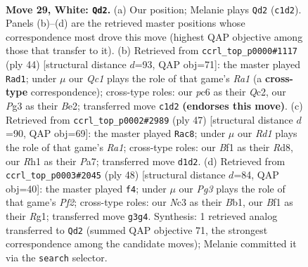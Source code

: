 \documentclass[11pt]{article}
\begin{document}
\clearpage

\begin{figure}[p]\centering
\begin{subfigure}{0.46\textwidth}\centering
\resizebox{\linewidth}{!}{%
\newchessgame
\chessboard[
  setfen={1nb3r1/rp4k1/2pqp3/p2p1p1p/Pn1P1P1N/2N3P1/1PP3KP/2QR1B1R w - - 11 29},
  showmover=false,
  pgfstyle=straightmove, color=movearrow, markmove={c1-d2}
]}
\caption{}
\end{subfigure}\hfill
\begin{subfigure}{0.46\textwidth}\centering
\resizebox{\linewidth}{!}{%
\newchessgame
\chessboard[
  setfen={r1r3k1/1p2qp1p/p2ppnpb/P7/1Pn1P3/2NR1P2/1PQ1BBPP/R5K1 w - - 1 23},
  showmover=false,
  pgfstyle=straightmove, color=movearrow, markmove={a1-d1}
]}
\caption{}
\end{subfigure}
\\[4pt]
\begin{subfigure}{0.46\textwidth}\centering
\resizebox{\linewidth}{!}{%
\newchessgame
\chessboard[
  setfen={r2r2k1/pb2qpp1/1p1ppn1p/4n3/1PPNP3/P1Q4P/3N1PP1/3RRBK1 b - - 0 24},
  showmover=false,
  pgfstyle=straightmove, color=movearrow, markmove={a8-c8}
]}
\caption{}
\end{subfigure}\hfill
\begin{subfigure}{0.46\textwidth}\centering
\resizebox{\linewidth}{!}{%
\newchessgame
\chessboard[
  setfen={1r1qbnk1/2r3pp/1p2p3/p2pPp2/Pn1P4/RNN1Q3/1P3PPP/1B4RK w - - 0 25},
  showmover=false,
  pgfstyle=straightmove, color=movearrow, markmove={f2-f4}
]}
\caption{}
\end{subfigure}
\caption{\textbf{Move 29, White: \texttt{Qd2}.} (a) Our position; Melanie plays \texttt{Qd2} (\texttt{c1d2}). Panels (b)--(d) are the retrieved master positions whose correspondence most drove this move (highest QAP objective among those that transfer to it). (b) Retrieved from \texttt{ccrl\_top\_p0000\#1117} (ply 44) [structural distance $d$=93, QAP obj=71]: the master played \texttt{Rad1}; under $\mu$ our \emph{Qc1} plays the role of that game's \emph{Ra1} (a \textbf{cross-type} correspondence); cross-type roles: our \emph{p}c6 as their \emph{Q}c2, our \emph{P}g3 as their \emph{B}e2; transferred move \texttt{c1d2} \textbf{(endorses this move)}. (c) Retrieved from \texttt{ccrl\_top\_p0002\#2989} (ply 47) [structural distance $d$=90, QAP obj=69]: the master played \texttt{Rac8}; under $\mu$ our \emph{Rd1} plays the role of that game's \emph{Ra1}; cross-type roles: our \emph{B}f1 as their \emph{R}d8, our \emph{R}h1 as their \emph{P}a7; transferred move \texttt{d1d2}. (d) Retrieved from \texttt{ccrl\_top\_p0003\#2045} (ply 48) [structural distance $d$=84, QAP obj=40]: the master played \texttt{f4}; under $\mu$ our \emph{Pg3} plays the role of that game's \emph{Pf2}; cross-type roles: our \emph{N}c3 as their \emph{B}b1, our \emph{B}f1 as their \emph{R}g1; transferred move \texttt{g3g4}. Synthesis: 1 retrieved analog transferred to \texttt{Qd2} (summed QAP objective 71, the strongest correspondence among the candidate moves); Melanie committed it via the \texttt{search} selector.}
\label{fig:thought-m56}
\end{figure}
\end{document}

